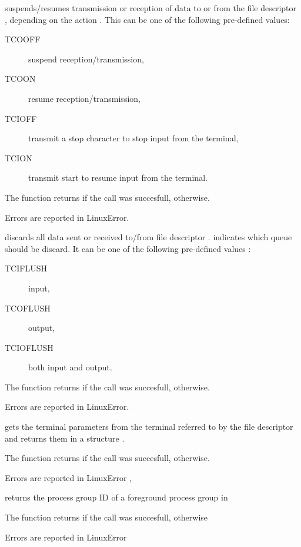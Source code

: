 { 
  suspends/resumes transmission or reception of data to or from the file
descriptor , depending
  on the action . This can be one of the following pre-defined
values: 
\begin{description}
\item [TCOOFF\ ] suspend reception/transmission,
\item [TCOON\ ] resume  reception/transmission,
\item [TCIOFF\ ] transmit a stop character to stop input from the terminal, 
\item [TCION\ ] transmit start to resume input from the terminal.
\end{description}

The function returns  if the call was succesfull, 
otherwise.
}
{Errors are reported in LinuxError.}
{}

{ 
  discards all data sent or received to/from file descriptor . 
  indicates which queue
  should be discard. It can be one of the following pre-defined values :
\begin{description}
\item [TCIFLUSH\ ] input,
\item [TCOFLUSH\ ] output,
\item [TCIOFLUSH\ ] both input and output.
\end{description}

The function returns  if the call was succesfull, 
otherwise.
}
{Errors are reported in LinuxError.}
{}

{ 
  gets the terminal parameters from the terminal referred to by the file
  descriptor  and returns them in a  structure . 

The function returns  if the call was succesfull, 
otherwise.
}
{Errors are reported in LinuxError}
{,  }



{ 
  returns the process group ID of a foreground process group in  

  The function returns  if the call was succesfull, 
  otherwise
}
{Errors are reported in LinuxError}
{}

